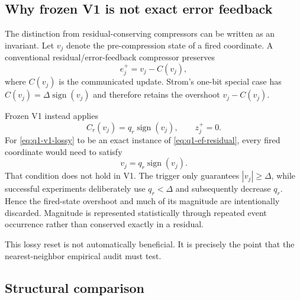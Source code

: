 \subsection{Why frozen V1 is not exact error feedback}

The distinction from residual-conserving compressors can be written as an invariant. Let $v_j$ denote the pre-compression state of a fired coordinate. A conventional residual/error-feedback compressor preserves
\begin{equation}
 e_j^+=v_j-C(v_j),
 \label{eq:q1-ef-residual}
\end{equation}
where $C(v_j)$ is the communicated update. Strom's one-bit special case has $C(v_j)=\Delta\operatorname{sign}(v_j)$ and therefore retains the overshoot $v_j-C(v_j)$.

Frozen V1 instead applies
\begin{equation}
 C_r(v_j)=q_r\operatorname{sign}(v_j),
 \qquad
 z_j^+=0.
 \label{eq:q1-v1-lossy}
\end{equation}
For \eqref{eq:q1-v1-lossy} to be an exact instance of \eqref{eq:q1-ef-residual}, every fired coordinate would need to satisfy
\begin{equation}
 v_j=q_r\operatorname{sign}(v_j).
\end{equation}
That condition does not hold in V1. The trigger only guarantees $|v_j|\geq\Delta$, while successful experiments deliberately use $q_r<\Delta$ and subsequently decrease $q_r$. Hence the fired-state overshoot and much of its magnitude are intentionally discarded. Magnitude is represented statistically through repeated event occurrence rather than conserved exactly in a residual.

This lossy reset is not automatically beneficial. It is precisely the point that the nearest-neighbor empirical audit must test.

\subsection{Structural comparison}

